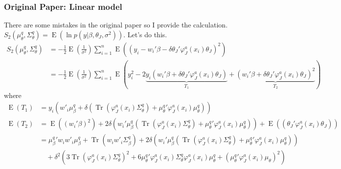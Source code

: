 \documentclass[11pt]{article}
\DeclareMathOperator{\Tr}{Tr}
\newcommand{\opn}{\operatorname}
\begin{document}
\subsubsection{Original Paper: Linear model}
There are some mistakes in the original paper so I provide the calculation. $S_{2}\left(\mu_{\theta}^{q}, \Sigma_{\theta}^{q}\right) = \opn{E}\left(\ln p\left(y|\beta, \theta_{J}, \sigma^{2}\right)\right)$. Let's do this.
\begin{align*}
  S_{2}\left(\mu_{\theta}^{q}, \Sigma_{\theta}^{q}\right) &= -\frac{1}{2}\opn{E}\left(\frac{1}{\sigma^{2}}\right)\sum_{i=1}^{n}\opn{E}\left(\left(y_{i}-w_{i}'\beta - \delta\theta_{J}'\varphi_{J}^{a}\left(x_{i}\right)\theta_{J}\right)^{2} \right)\\
  &= -\frac{1}{2}\opn{E}\left(\frac{1}{\sigma^{2}}\right)\sum_{i=1}^{n}\opn{E}\left(y_{i}^{2}-2\underbrace{y_{i}\left(w_{i}'\beta+\delta \theta_{J}'\varphi_{J}^{a}\left(x_{i}\right)\theta_{J}\right)}_{T_{1}}+\underbrace{\left(w_{i}'\beta + \delta \theta_{J}'\varphi_{J}^{a}\left(x_{i}\right)\theta_{J}\right)^{2}}_{T_{2}} \right)
\end{align*}
where
\begin{align*}
  \opn{E}\left(T_{1}\right) &= y_{i}\left(w'_{i}\mu_{\beta}^{q} + \delta\left(\Tr\left(\varphi_{J}^{a}\left(x_{i}\right)\Sigma_{\theta}^{q}\right) + {\mu_{\theta}^{q}}'\varphi_{J}^{a}\left(x_{i}\right)\mu_{\theta}^{q}\right)\right)\\
  \opn{E}\left(T_{2}\right) &= \opn{E}\left(\left(w_{i}'\beta\right)^{2}\right) + 2\delta \left(w_{i}'\mu_{\beta}^{q}\left(\Tr\left(\varphi_{J}^{a}\left(x_{i}\right)\Sigma_{\theta}^{q}\right) + {\mu_{\theta}^{q}}'\varphi_{J}^{a}\left(x_{i}\right)\mu_{\theta}^{q}\right) \right) + \opn{E}\left(\left(\theta_{J}'\varphi_{J}^{a}\left(x_{i}\right)\theta_{J}\right)\right)\\
  &= {\mu_{\beta}^{q}}'w_{i}w'_{i}\mu_{\beta}^{q} + \Tr\left(w_{i}w'_{i}\Sigma_{\beta}^{q}\right) + 2\delta \left(w_{i}'\mu_{\beta}^{q}\left(\Tr\left(\varphi_{J}^{a}\left(x_{i}\right)\Sigma_{\theta}^{q}\right) + {\mu_{\theta}^{q}}'\varphi_{J}^{a}\left(x_{i}\right)\mu_{\theta}^{q}\right) \right)\\
  &\quad + \delta^{2}\left(3\Tr\left(\varphi_{J}^{a}\left(x_{i}\right)\Sigma_{\theta}^{q}\right)^{2} + 6{\mu_{\theta}^{q}}'\varphi_{J}^{a}\left(x_{i}\right)\Sigma_{\theta}^{q}\varphi_{J}^{a}\left(x_{i}\right)\mu_{\theta}^{q} + \left({\mu_{\theta}^{q}}'\varphi_{J}^{a}\left(x_{i}\right)\mu_{\theta}\right)^{2} \right)
\end{align*}
\end{document}
